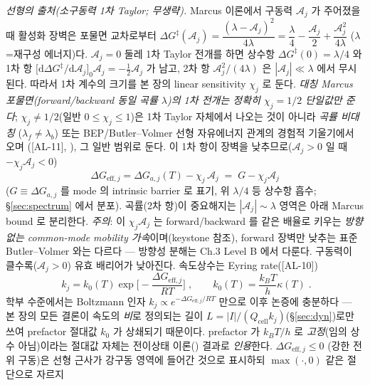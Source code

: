 \documentclass[11pt,a4paper]{article}
\newcommand{\dd}{\mathrm{d}}
\newcommand{\eff}{\mathrm{eff}}
\newcommand{\cell}{\mathrm{cell}}
\newcommand{\AL}[1]{\textsf{[AL-#1]}}
\begin{document}
\emph{선형의 출처(소구동력 1차 Taylor; 무생략).} Marcus 이론에서 구동력 $\mathcal A_j$ 가 주어졌을 때
활성화 장벽은 포물면 교차로부터 $\Delta G^\ddagger(\mathcal A_j)=\dfrac{(\lambda-\mathcal A_j)^2}{4\lambda}
=\dfrac{\lambda}{4}-\dfrac{\mathcal A_j}{2}+\dfrac{\mathcal A_j^2}{4\lambda}$ ($\lambda$=재구성 에너지)다.
$\mathcal A_j=0$ 둘레 1차 Taylor 전개를 하면 상수항 $\Delta G^\ddagger(0)=\lambda/4$ 와 1차 항
$\big[\dd\Delta G^\ddagger/\dd\mathcal A_j\big]_{0}\mathcal A_j=-\tfrac12\mathcal A_j$ 가 남고, 2차 항
$\mathcal A_j^2/(4\lambda)$ 은 $|\mathcal A_j|\ll\lambda$ 에서 무시된다. 따라서 1차 계수의 크기를 본 장의 linear sensitivity
$\chi_j$ 로 둔다. \emph{대칭 Marcus 포물면(forward/backward 동일 곡률 $\lambda$)의 1차 전개는 정확히 $\chi_j=1/2$
단일값만 준다}; $\chi_j\ne1/2$(일반 $0\le\chi_j\le1$)은 1차 Taylor 자체에서 나오는 것이 아니라 \emph{곡률 비대칭}
($\lambda_f\ne\lambda_b$) 또는 BEP/Butler--Volmer 선형 자유에너지 관계의 경험적 기울기에서 오며
(\AL{11}, \cite{evanspolanyi1938,bardfaulkner}), 그 일반 범위로 둔다. 이 1차 항이 장벽을 낮추므로($\mathcal A_j>0$ 일 때 $-\chi_j\mathcal A_j<0$)
\begin{equation}
\boxed{\;\Delta G_{\eff,j}=\Delta G_{a,j}(T)-\chi_j\,\mathcal A_j\;=\;G-\chi_j\mathcal A_j\;}
\label{eq:Geff}
\end{equation}
($G\equiv\Delta G_{a,j}$ 를 mode 의 intrinsic barrier 로 표기, 위 $\lambda/4$ 등 상수항 흡수;
\S\ref{sec:spectrum} 에서 분포). 곡률(2차 항)이 중요해지는 $|\mathcal A_j|\sim\lambda$ 영역은 아래 Marcus
bound 로 분리한다. \emph{주의}: 이 $\chi_j\mathcal A_j$ 는 forward/backward 를 같은 배율로 키우는
\emph{방향 없는 common-mode mobility 가속}이며(keystone 참조), forward 장벽만 낮추는 표준 Butler--Volmer
와는 다르다 — 방향성 분해는 Ch.3 Level B 에서 다룬다. 구동력이
클수록($\mathcal A_j>0$) 유효 배리어가 낮아진다. 속도상수는 Eyring rate(\AL{10})
\begin{equation}
\boxed{\;k_j=k_0(T)\exp\!\Big[-\frac{\Delta G_{\eff,j}}{RT}\Big]\;,\qquad k_0(T)=\frac{k_BT}{h}\kappa(T)\;.}
\label{eq:kact}
\end{equation}
학부 수준에서는 Boltzmann 인자 $k_j\propto e^{-\Delta G_{\eff,j}/RT}$ 만으로 이후 논증에 충분하다 — 본 장의
모든 결론이 속도의 \emph{비}로 정의되는 길이 $L=|I|/(Q_\cell k_j)$(\S\ref{sec:dyn})로만 쓰여 prefactor 절대값
$k_0$ 가 상쇄되기 때문이다. prefactor 가 $k_BT/h$ 로 \emph{고정}(임의 상수 아님)이라는 절대값 자체는 전이상태
이론(\cite{eyring1935}) 결과로 \emph{인용}한다. $\Delta G_{\eff,j}\le0$
(강한 전위 구동)은 선형 근사가 강구동 영역에 들어간 것으로 표시하되 $\max(\cdot,0)$ 같은 절단으로 자르지
\end{document}

